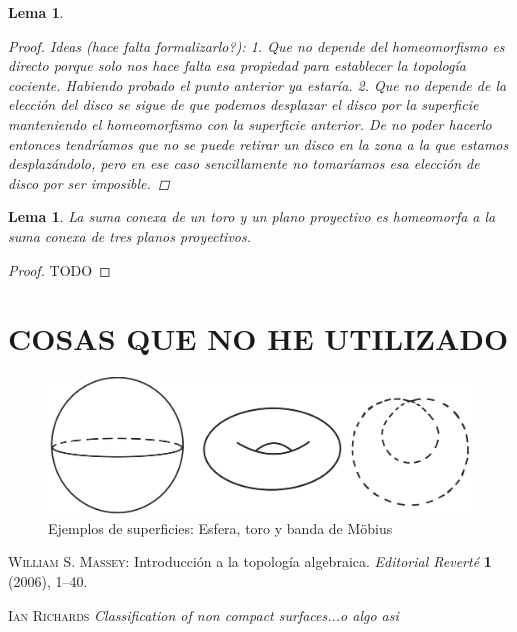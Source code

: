 \documentclass[a4paper,11pt,spanish, twoside, leqno]{tfg-uam}
\newtheorem{lema}[teor]{Lema}
\theoremstyle{definition}
\begin{document}
\begin{lema}
\begin{enumerate}
\begin{proof}
			Ideas (hace falta formalizarlo?):
			1. Que no depende del homeomorfismo es directo porque solo nos hace falta esa propiedad para establecer la topología cociente. Habiendo probado el punto anterior ya estaría.
			2. Que no depende de la elección del disco se sigue de que podemos desplazar el disco por la superficie manteniendo el homeomorfismo con la superficie anterior. De no poder hacerlo entonces tendríamos que no se puede retirar un disco en la zona a la que estamos desplazándolo, pero en ese caso sencillamente no tomaríamos esa elección de disco por ser imposible.
		\end{proof}
	\end{enumerate} 
\end{lema}


\begin{lema}\label{lema:planop+toro=3planop}
La suma conexa de un toro y un plano proyectivo es homeomorfa a la suma conexa de tres planos proyectivos.
\end{lema}
\begin{proof}
TODO
\end{proof}





\chapter{COSAS QUE NO HE UTILIZADO}

\begin{figure}[h!]
	\centering
	\includegraphics[width=0.5\linewidth]{imagenes/superficies.png}
	\caption{Ejemplos de superficies: Esfera, toro y banda de M\"obius}
	\label{fig:superficies sencillas}
\end{figure} 





\begin{thebibliography}{10}
    \textsc{William S. Massey}: 
    Introducción a la topología algebraica. 
    \textit{Editorial Reverté} {\bf1} (2006), 1--40.

    \textsc{Ian Richards}
    \textit{Classification of non compact surfaces...o algo asi}
    
    
\end{thebibliography}
\cleardoublepage
\end{document}
